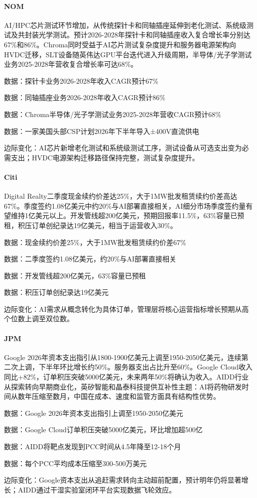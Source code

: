 \documentclass[11pt]{ctexart}
\begin{document}
\paragraph{NOM} AI/HPC芯片测试环节增加，从传统探针卡和同轴插座延伸到老化测试、系统级测试及共封装光学测试。预计2026-2028年探针卡和同轴插座收入复合增长率分别达67\%和86\%。Chroma同时受益于AI芯片测试复杂度提升和服务器电源架构向HVDC迁移，SLT设备随英伟达GPU平台迭代进入升级周期，半导体/光子学测试业务2025-2028年营收复合增长率可达68\%。
{\small\color{refgray}数据：探针卡业务2026-2028年收入CAGR预计67\%\par}
{\small\color{refgray}数据：同轴插座业务2026-2028年收入CAGR预计86\%\par}
{\small\color{refgray}数据：Chroma半导体/光子学测试业务2025-2028年营收CAGR预计68\%\par}
{\small\color{refgray}数据：一家美国头部CSP计划2026年下半年导入±400V直流供电\par}
{\small\color{refgray}边际变化：AI芯片新增老化测试和系统级测试工序，测试设备从可选支出变为必需支出；HVDC电源架构迁移路径保持完整，测试复杂度提升。\par}
\paragraph{Citi} Digital Realty二季度现金续约价差达25\%，大于1MW批发租赁续约价差高达67\%。季度签约1.08亿美元中约20\%与AI部署直接相关，AI细分市场季度签约量有望维持1亿美元以上。开发管线超200亿美元，预期回报率11.5\%，63\%容量已预租，积压订单创纪录达19亿美元，相当于运营收入30\%。
{\small\color{refgray}数据：现金续约价差25\%，大于1MW批发租赁续约价差67\%\par}
{\small\color{refgray}数据：二季度签约1.08亿美元，约20\%与AI部署直接相关\par}
{\small\color{refgray}数据：开发管线超200亿美元，63\%容量已预租\par}
{\small\color{refgray}数据：积压订单创纪录达19亿美元\par}
{\small\color{refgray}边际变化：AI需求从概念转化为具体订单，管理层将核心运营指标增长预期从高个位数上调至双位数。\par}
\paragraph{JPM} Google 2026年资本支出指引从1800-1900亿美元上调至1950-2050亿美元，连续第二次上调，下半年环比增长约50\%。服务器支出占比升至60\%。Google Cloud收入同比+82\%，订单积压突破5000亿美元，未来两年50\%将确认为收入。AIDD行业从探索转向早期商业化，英矽智能和晶泰科技提供互补性主题：AI将药物研发时间从数年压缩至数月，中国在成本、速度和监管方面具有结构性优势。
{\small\color{refgray}数据：Google 2026年资本支出指引上调至1950-2050亿美元\par}
{\small\color{refgray}数据：Google Cloud订单积压突破5000亿美元，环比增加超500亿\par}
{\small\color{refgray}数据：AIDD将靶点发现到PCC时间从4.5年降至12-18个月\par}
{\small\color{refgray}数据：每个PCC平均成本压缩至300-500万美元\par}
{\small\color{refgray}边际变化：Google资本支出从追赶需求转向主动超前配置，预计明年仍将显著增长；AIDD通过干湿实验室闭环平台实现数据飞轮效应。\par}
\end{document}
